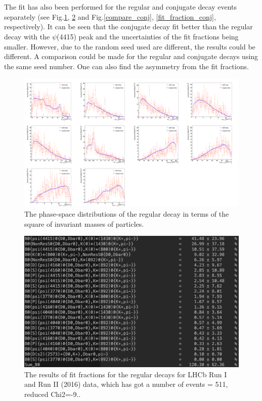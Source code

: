 \\
\\
The fit has also been performed for the regular and conjugate decay events separately (see Fig.\ref{compare_reg}, \ref{fit_fraction_reg} and Fig.\ref{compare_conj}, \ref{fit_fraction_conj}, respectively). It can be seen that the conjugate decay fit better than the regular decay with the $\psi$(4415) peak and the uncertainties of the fit fractions being smaller. However, due to the random seed used are different, the results could be different. A comparison could be made for the regular and conjugate decays using the same seed number. One can also find the asymmetry from the fit fractions.
\begin{figure}[h]
\center
\includegraphics*[width=1.06\linewidth]{amplitude_fit/compare_reg}
\caption{The phase-space distributions of the regular decay in terms of the square of invariant masses of particles.}
\label{compare_reg}
\end{figure}
\begin{figure}[h]
\center
\includegraphics*[width=0.96\linewidth]{amplitude_fit/fit_fraction_reg}
\caption{The results of fit fractions for the regular decays for LHCb Run I and Run II (2016) data, which has got a number of events = 511, reduced Chi2=-9..}
\label{fit_fraction_reg}
\end{figure}
